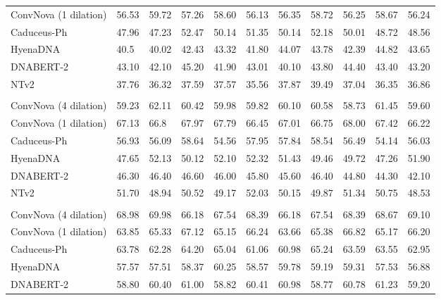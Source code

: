 \begin{table}[htbp]
{\begin{tabular}{lllllllllll}
    \rowcolor{low}ConvNova (1 dilation) & 56.53 & 59.72 & 57.26 & 58.60  & 56.13 & 56.35 & 58.72 & 56.25 & 58.67 & 56.24 \\
    Caduceus-Ph& 47.96 & 47.23 & 52.47 & 50.14 & 51.35 & 50.14 & 52.18 & 50.01 & 48.72 & 48.56 \\
    HyenaDNA  & 40.5  & 40.02 & 42.43 & 43.32 & 41.80  & 44.07 & 43.78 & 42.39 & 44.82 & 43.65 \\
    DNABERT-2  & 43.10  & 42.10  & 45.20  & 41.90  & 43.01 & 40.10  & 43.80  & 44.40  & 43.40  & 43.20 \\
    NTv2 & 37.76 & 36.32 & 37.59 & 37.57 & 35.56 & 37.87 & 39.49 & 37.04 & 36.35 & 36.86 \\
    \midrule
    \rowcolor{titlebg}\multicolumn{11}{l}{\textit{\textbf{H3K4me3}}} \\
    \rowcolor{low}ConvNova (4 dilation)   & 59.23 & 62.11 & 60.42 & 59.98 & 59.82 & 60.10  & 60.58 & 58.73 & 61.45 & 59.60 \\
    \rowcolor{low}ConvNova (1 dilation)   & 67.13 & 66.8  & 67.97 & 67.79 & 66.45 & 67.01 & 66.75 & 68.00    & 67.42 & 66.22 \\
    Caduceus-Ph& 56.93 & 56.09 & 58.64 & 54.56 & 57.95 & 57.84 & 58.54 & 56.49 & 54.14 & 56.03 \\
    HyenaDNA  & 47.65 & 52.13 & 50.12 & 52.10  & 52.32 & 51.43 & 49.46 & 49.72 & 47.26 & 51.90 \\
    DNABERT-2 & 46.30  & 46.40  & 46.60  & 46.00  & 45.80  & 45.60  & 46.40  & 44.80  & 44.30  & 42.10 \\
    NTv2 & 51.70 & 48.94 & 50.52 & 49.17 & 52.03 & 50.15 & 49.87 & 51.34 & 50.75 & 48.53 \\
    \midrule
    \rowcolor{titlebg}\multicolumn{11}{l}{\textit{\textbf{H3K9ac}}} \\
    \rowcolor{low}ConvNova (4 dilation)  & 68.98 & 69.98 & 66.18 & 67.54 & 68.39 & 66.18 & 67.54 & 68.39 & 68.67 & 69.10 \\
    \rowcolor{low}ConvNova (1 dilation) & 63.85 & 65.33 & 67.12 & 65.15 & 66.24 & 63.66 & 65.38 & 66.82 & 65.17 & 66.20 \\
    Caduceus-Ph& 63.78 & 62.28 & 64.20  & 65.04 & 61.06 & 60.98 & 65.24 & 63.59 & 63.55 & 62.95 \\
    HyenaDNA  & 57.57 & 57.51 & 58.37 & 60.25 & 58.57 & 59.78 & 59.19 & 59.31 & 57.53 & 56.88 \\
    DNABERT-2  & 58.80  & 60.40  & 61.00  & 58.82  & 60.41  & 60.98  & 58.77  & 60.78  & 61.23  & 59.20 \\

\end{tabular}}
\end{table}
